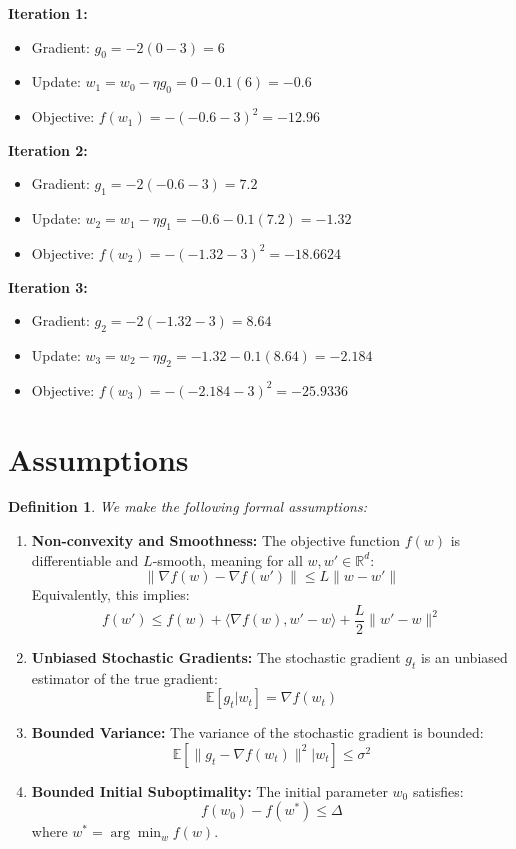 \documentclass{article}
\newtheorem{definition}[theorem]{Definition}
\begin{document}
\textbf{Iteration 1:}
\begin{itemize}
    \item Gradient: $g_0 = -2(0 - 3) = 6$
    \item Update: $w_1 = w_0 - \eta g_0 = 0 - 0.1(6) = -0.6$
    \item Objective: $f(w_1) = -(-0.6 - 3)^2 = -12.96$
\end{itemize}

\textbf{Iteration 2:}
\begin{itemize}
    \item Gradient: $g_1 = -2(-0.6 - 3) = 7.2$
    \item Update: $w_2 = w_1 - \eta g_1 = -0.6 - 0.1(7.2) = -1.32$
    \item Objective: $f(w_2) = -(-1.32 - 3)^2 = -18.6624$
\end{itemize}

\textbf{Iteration 3:}
\begin{itemize}
    \item Gradient: $g_2 = -2(-1.32 - 3) = 8.64$
    \item Update: $w_3 = w_2 - \eta g_2 = -1.32 - 0.1(8.64) = -2.184$
    \item Objective: $f(w_3) = -(-2.184 - 3)^2 = -25.9336$
\end{itemize}

\section*{Assumptions}
\begin{definition}
We make the following formal assumptions:
\end{definition}
\begin{enumerate}
    \item \textbf{Non-convexity and Smoothness:} The objective function $f(w)$ is differentiable and $L$-smooth, meaning for all $w, w' \in \mathbb{R}^d$:
    $$\|\nabla f(w) - \nabla f(w')\| \leq L \|w - w'\|$$
    Equivalently, this implies:
    $$f(w') \leq f(w) + \langle \nabla f(w), w' - w \rangle + \frac{L}{2} \|w' - w\|^2$$
    \item \textbf{Unbiased Stochastic Gradients:} The stochastic gradient $g_t$ is an unbiased estimator of the true gradient:
    $$\mathbb{E}[g_t | w_t] = \nabla f(w_t)$$
    \item \textbf{Bounded Variance:} The variance of the stochastic gradient is bounded:
    $$\mathbb{E}[\|g_t - \nabla f(w_t)\|^2 | w_t] \leq \sigma^2$$
    \item \textbf{Bounded Initial Suboptimality:} The initial parameter $w_0$ satisfies:
    $$f(w_0) - f(w^*) \leq \Delta$$
    where $w^* = \arg\min_w f(w)$.
\end{enumerate}
\end{document}
